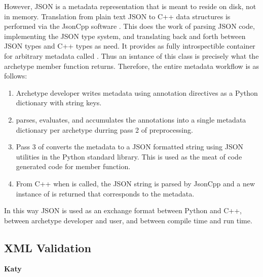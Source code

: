However, JSON is a metadata representation that is meant to reside on disk, 
not in memory. Translation from plain text JSON to C++ data structures is 
performed via the JsonCpp software \cite{eltuhamy2014native}. This does the work 
of parsing JSON code, implementing the JSON type system, and translating back and
forth between JSON types and C++ types as need. It provides as fully introspectible 
container for arbitrary metadata called .  Thus an isntance of this 
class is precisely what the  archetype member function returns.
Therefore, the entire metadata workflow is as follows:
\begin{enumerate}
    \item Archetype developer writes metadata using annotation directives as a
          Python dictionary with string keys.
    \item \cycpp parses, evaluates, and accumulates the annotations into a single 
          metadata dictionary per archetype durring pass 2 of preprocessing.
    \item Pass 3 of \cycpp converts the metadata to a JSON formatted string using 
          JSON utilities in the Python standard library. This is used as the meat of
          code generated code for  member function.
    \item From C++ when  is called, the JSON string is parsed 
          by JsonCpp and a new instance of  is returned that
          corresponds to the metadata.
\end{enumerate}
In this way JSON is used as an exchange format between Python and C++, between 
archetype developer and user, and between compile time and run time.

\subsection{XML Validation}

\textbf{Katy}

